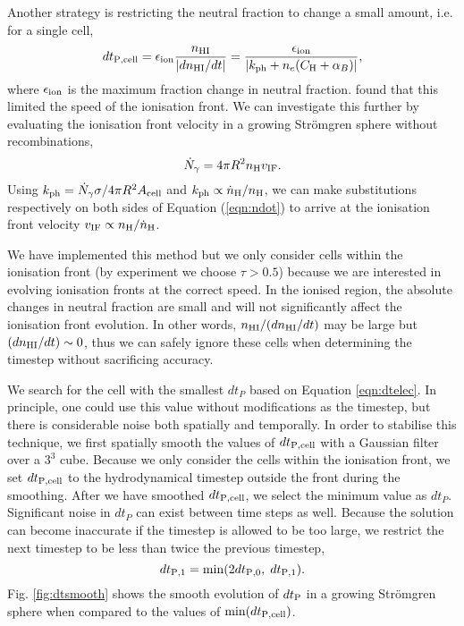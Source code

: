 \documentclass[useAMS,usenatbib]{mn2e}
\begin{document}
Another strategy is restricting the neutral fraction to change a small
amount, i.e. for a single cell,
%
\begin{equation}
  \label{eqn:dtelec}
  dt_{\rm P,cell} = \epsilon_{\rm ion} \frac{n_{\rm HI}}{|dn_{\rm HI}/dt|} =
  \frac{\epsilon_{\rm ion}}{|k_{\rm ph} + n_e (C_{\rm H} + \alpha_B)|},
\end{equation}
where $\epsilon_{\rm ion}$ is the maximum fraction change in neutral
fraction.  \citet{Shapiro04} found that this limited the speed of the
ionisation front.  We can investigate this further by evaluating the
ionisation front velocity in a growing Str\"{o}mgren sphere without
recombinations, 
\begin{equation}
  \label{eqn:ndot}
  \dot{N}_\gamma = 4 \pi R^2 n_{\rm H} v_{\rm IF}.
\end{equation}
Using $\kph = \dot{N}_\gamma \sigma / 4\pi R^2 A_{\rm cell}$ and $\kph
\propto \dot{n}_{\rm H} / n_{\rm H}$, we can make substitutions
respectively on both sides of Equation (\ref{eqn:ndot}) to arrive at
the ionisation front velocity $v_{\rm IF} \propto n_{\rm H}
/\dot{n}_{\rm H}$.

We have implemented this method but we only consider cells within the
ionisation front (by experiment we choose $\tau > 0.5$) because we are
interested in evolving ionisation fronts at the correct speed.  In the
ionised region, the absolute changes in neutral fraction are small and
will not significantly affect the ionisation front evolution.  In
other words, $n_{\rm HI}/(dn_{\rm HI}/dt)$ may be large but $(dn_{\rm
  HI}/dt) \sim 0$, thus we can safely ignore these cells when
determining the timestep without sacrificing accuracy.

We search for the cell with the smallest $dt_P$ based on Equation
\ref{eqn:dtelec}.  In principle, one could use this value without
modifications as the timestep, but there is considerable noise both
spatially and temporally.  In order to stabilise this technique, we
first spatially smooth the values of $dt_{\rm P,cell}$ with a Gaussian
filter over a $3^3$ cube.  Because we only consider the cells within
the ionisation front, we set $dt_{\rm P,cell}$ to the hydrodynamical
timestep outside the front during the smoothing.  After we have
smoothed $dt_{\rm P,cell}$, we select the minimum value as $dt_P$.
Significant noise in $dt_P$ can exist between time steps as well.
Because the solution can become inaccurate if the timestep is allowed
to be too large, we restrict the next timestep to be less than twice
the previous timestep,
%
\begin{equation}
  \label{eqn:dtchange}
  dt_{\rm P,1} = \min(2 dt_{\rm P,0},\; dt_{\rm P,1}).
\end{equation}
Fig. \ref{fig:dtsmooth} shows the smooth evolution of $dt_{\rm P}$
in a growing Str\"{o}mgren sphere when compared to the values of
$\min(dt_{\rm P,cell})$.
\end{document}
